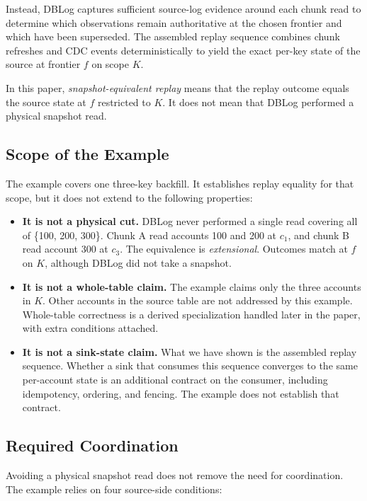 \documentclass[letterpaper,10pt,twocolumn]{article}
\providecommand{\tightlist}{\setlength{\itemsep}{0pt}\setlength{\parskip}{0pt}}
\begin{document}
Instead, DBLog captures sufficient source-log evidence around each
chunk read to determine which observations remain authoritative at the
chosen frontier and which have been superseded. The assembled replay
sequence combines chunk refreshes and CDC events deterministically to
yield the exact per-key state of the source at frontier $f$ on scope $K$.

In this paper, \emph{snapshot-equivalent replay} means that the replay
outcome equals the source state at $f$ restricted to $K$. It does not
mean that DBLog performed a physical snapshot read.

\subsection{Scope of the Example}\label{what-this-example-does-not-show}

The example covers one three-key backfill. It establishes replay
equality for that scope, but it does not extend to the following properties:

\begin{itemize}
\tightlist
\item
  \textbf{It is not a physical cut.} DBLog never performed a single read
  covering all of \{100, 200, 300\}. Chunk A read accounts 100 and 200 at
  $c_1$, and chunk B read account 300 at $c_3$. The equivalence is
  \emph{extensional}. Outcomes match at $f$ on $K$, although DBLog did
  not take a snapshot.
\item
  \textbf{It is not a whole-table claim.} The example claims only the
  three accounts in $K$. Other accounts in the source table are not
  addressed by this example. Whole-table correctness is a derived
  specialization handled later in the paper, with extra conditions
  attached.
\item
  \textbf{It is not a sink-state claim.} What we have shown is the
  assembled replay sequence. Whether a sink that consumes
  this sequence converges to the same per-account state is an additional
  contract on the consumer, including idempotency, ordering, and
  fencing. The example does not establish that contract.
\end{itemize}

\subsection{Required Coordination}\label{what-coordination-dblog-still-needs}

Avoiding a physical snapshot read does not remove the need for
coordination. The example relies on four source-side conditions:
\end{document}
